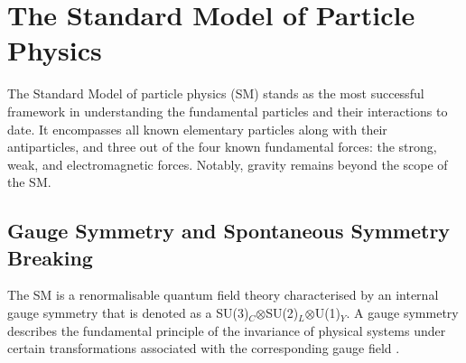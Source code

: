 \documentclass[bachelor,ngerman,english]{GAUBM}
\begin{document}






\chapter{The Standard Model of Particle Physics}
\label{ch:standard_model}
The Standard Model of particle physics (SM) stands as the most successful framework in understanding the fundamental particles and their interactions to date. It encompasses all known elementary particles along with their antiparticles, and three out of the four known fundamental forces: the strong, weak, and electromagnetic forces. Notably, gravity remains beyond the scope of the SM.


\section{Gauge Symmetry and Spontaneous Symmetry Breaking}
\label{sec:theory:gauge_symmetry_and_higgs_meachanism}
The SM is a renormalisable quantum field theory \cite{theory:quantum_fields_01,theory:quantum_fields_02} characterised by an internal gauge symmetry that is denoted as a SU(3)$_C$$\otimes$SU(2)$_L$$\otimes$U(1)$_Y$. A gauge symmetry describes the fundamental principle of the invariance of physical systems under certain transformations associated with the corresponding gauge field \cite{theory:gauge_fields}. 
\end{document}
